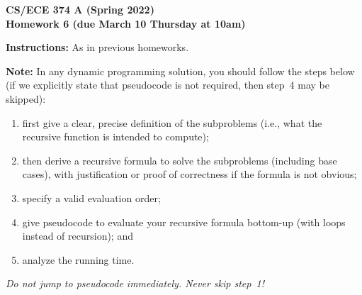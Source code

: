 \documentclass[11pt]{article}
\begin{document}
\begin{center}\Large\bf 
CS/ECE 374 A (Spring 2022)\\
{\Large Homework 6} (due March 10 Thursday at 10am)
\end{center}

\medskip\noindent
{\bf Instructions:} As in previous homeworks.

\bigskip\noindent
{\bf Note:} In any dynamic programming solution, you should 
follow the steps below (if we explicitly state that pseudocode is not required, then step~4 may be skipped):
\begin{enumerate}
\item first give a clear, precise definition of the subproblems (i.e., what the recursive
function is intended to compute);
\item then derive a recursive formula to solve the subproblems (including
base cases), with justification or proof of correctness if the formula is not
obvious;
\item specify a valid evaluation order;
\item give pseudocode to evaluate your recursive formula bottom-up (with loops instead of recursion);
and 
\item analyze the running time.
\end{enumerate}
{\em Do not jump to pseudocode immediately.  Never skip step~1!}
\end{document}
